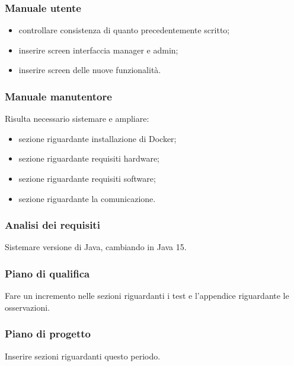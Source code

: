 \subsubsection{Manuale utente}
\begin{itemize}
	\item controllare consistenza di quanto precedentemente scritto;
	\item inserire screen interfaccia manager e admin;
	\item inserire screen delle nuove funzionalità.	
\end{itemize}
\subsubsection{Manuale manutentore}
Risulta necessario sistemare e ampliare:
\begin{itemize}
	\item sezione riguardante installazione di Docker;
	\item sezione riguardante requisiti hardware;
	\item sezione riguardante requisiti software;
	\item sezione riguardante la comunicazione.	
\end{itemize}
\subsubsection{Analisi dei requisiti}
Sistemare versione di Java, cambiando in Java 15.
\subsubsection{Piano di qualifica}
Fare un incremento nelle sezioni riguardanti i test e l'appendice riguardante le osservazioni.
\subsubsection{Piano di progetto}
Inserire sezioni riguardanti questo periodo.

